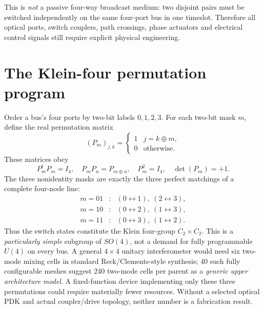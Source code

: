 \documentclass[10pt]{article}
\begin{document}
\begin{center}
\end{center}
This is \emph{not} a passive four-way broadcast medium:
two disjoint pairs must be switched independently on the same
four-port bus in one timeslot. Therefore all optical ports,
switch couplers, path crossings, phase actuators and electrical
control signals still require explicit physical engineering.

\section{The Klein-four permutation program}
Order a bus's four ports by two-bit labels $0,1,2,3$.
For each two-bit mask $m$, define the real permutation matrix
\[
(P_m)_{j,k}=
\begin{cases}
1&j=k\oplus m,\\
0&\text{otherwise}.
\end{cases}
\]
These matrices obey
\[
P_m^\dagger P_m=I_4,\quad
P_m P_n=P_{m\oplus n},\quad
P_m^2=I_4,\quad \det(P_m)=+1.
\]
The three nonidentity masks are exactly the three perfect
matchings of a complete four-node line:
\[
\begin{array}{rcl}
m=01 &: &(0\leftrightarrow1),\ (2\leftrightarrow3),\\
m=10 &: &(0\leftrightarrow2),\ (1\leftrightarrow3),\\
m=11 &: &(0\leftrightarrow3),\ (1\leftrightarrow2).
\end{array}
\]
Thus the switch states constitute the Klein four-group
$C_2\times C_2$. This is a \emph{particularly simple}
subgroup of $SO(4)$, not a demand for fully programmable
$U(4)$ on every bus.
A general $4\times4$ unitary interferometer would need six
two-mode mixing cells in standard Reck/Clements-style synthesis;
40 such fully configurable meshes suggest 240 two-mode cells
per parent as a \emph{generic upper architecture model}.
A fixed-function device implementing only these three
permutations could require materially fewer resources.
Without a selected optical PDK and actual coupler/drive
topology, neither number is a fabrication result.
\end{document}
